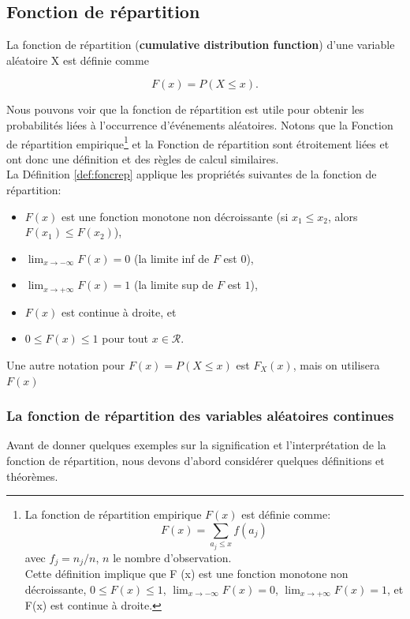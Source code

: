 \subsection{Fonction de répartition}
\theoremstyle{definition}
\begin{definition}{}\label{def:foncrep}

La fonction de répartition (\textbf{cumulative distribution function}) d'une variable aléatoire X est définie comme

\begin{equation}
    F(x) = P(X\leq x).
\end{equation}
\end{definition}
Nous pouvons voir que la fonction de répartition est utile pour obtenir les probabilités liées à l'occurrence d'événements
aléatoires. Notons que la Fonction de répartition empirique\footnote{La fonction de répartition empirique $ F (x) $ est
définie comme:
\begin{equation}
    F(x) = \sum_{a_j\leq x}f(a_j)
\end{equation}
avec $f_j =n_j/n$, $n$ le nombre d'observation.\\ Cette définition implique que F (x) est une fonction monotone non
décroissante, $0\leq F(x)\leq1$, $\lim_{x \to-\infty}F(x) = 0$, $\lim_{x \to+\infty}F(x) = 1$, et F(x) est continue à
droite.} et la Fonction de répartition sont étroitement liées et ont donc une définition et des règles de calcul
similaires.\\

La Définition \ref{def:foncrep} applique les propriétés suivantes de la fonction de répartition:
\begin{itemize}
\item $F(x)$ est une fonction monotone non décroissante (si $x_1\leq x_2$, alors $F(x_1)\leq F(x_2)$),
\item $\lim_{x\to-\infty}F(x)=0$ (la limite inf de $F$ est $0$),
\item $\lim_{x\to+\infty}F(x)=1$ (la limite sup de $F$ est $1$),
\item $F(x)$ est continue à droite, et
\item $0\leq F(x)\leq1$ pour tout $x\in\mathcal{R}$.
\end{itemize}
Une autre notation pour $F(x)=P(X\leq x)$ est $F_{X}(x)$, mais on utilisera $F(x)$

\subsubsection{La fonction de répartition des variables aléatoires continues}
Avant de donner quelques exemples sur la signification et l'interprétation de la fonction de répartition, nous devons
d'abord considérer quelques définitions et théorèmes.

